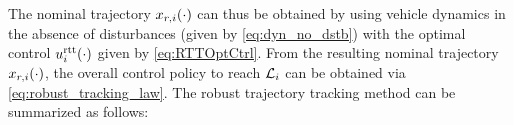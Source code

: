 The nominal trajectory $x_{r,i}(\cdot)$ can thus be obtained by using vehicle dynamics in the absence of disturbances (given by \eqref{eq:dyn_no_dstb})
%
with the optimal control  $u_i^\text{rtt}(\cdot)$ given by \eqref{eq:RTTOptCtrl}. From the resulting nominal trajectory $x_{r,i}(\cdot)$, the overall control policy to reach $\mathcal{L}_i$ can be obtained via \eqref{eq:robust_tracking_law}. The robust trajectory tracking method can be summarized as follows:\\
%
